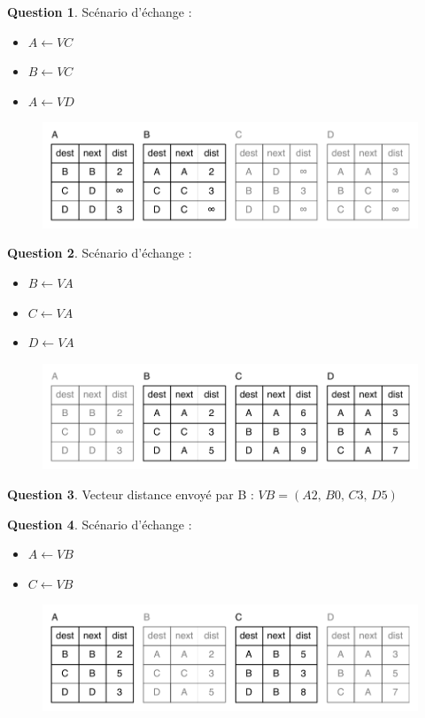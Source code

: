 \documentclass[11pt,english,french]{scrreprt}
\theoremstyle{remark}
\theoremstyle{definition}
\newtheorem{ques}{Question}[section]
\begin{document}
\begin{ques}
	Scénario d'échange :\begin{itemize}
		\item $A\leftarrow VC$
		\item $B\leftarrow VC$
		\item $A\leftarrow VD$ 
	\end{itemize}
	\begin{figure}[h!]
		\center
		\includegraphics[scale=.7]{Exam2009/tables3}
	\end{figure}
\end{ques}
\clearpage
\begin{ques}
	Scénario d'échange :\begin{itemize}
		\item $B\leftarrow VA$
		\item $C\leftarrow VA$
		\item $D\leftarrow VA$
	\end{itemize}
	\begin{figure}[h!]
		\center
		\includegraphics[scale=.7]{Exam2009/tables4}
	\end{figure}
\end{ques}

\begin{ques}
	Vecteur distance envoyé par B : $VB=(A2,\,B0,\,C3,\,D5)$
\end{ques}

\begin{ques}
	Scénario d'échange : \begin{itemize}
		\item $A\leftarrow VB$
		\item $C\leftarrow VB$
	\end{itemize}
	\begin{figure}[h!]
		\center
		\includegraphics[scale=.7]{Exam2009/tables5}
	\end{figure}
\end{ques}
\end{document}
